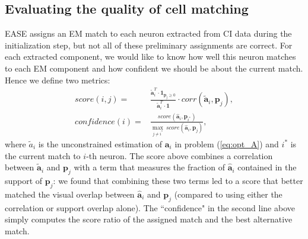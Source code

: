 \documentclass[10pt,letterpaper]{article}
\begin{document}
{%
\subsection{Evaluating the quality of cell matching}
EASE assigns an EM match to each neuron extracted from CI data during the initialization step, but not all of these preliminary assignments are correct. For each extracted component, we would like to know how well this neuron matches to each EM component and how confident we should be about the current match. Hence we define two metrics: 
 \begin{align}
 score(i, j) =& \frac{\tilde{\bm{a}}_i^T \cdot \bm{1}_{\bm{p}_j\geq 0} }{\tilde{\bm{a}}_i^T \cdot \bm{1}} \cdot corr(\tilde{\bm{a}}_{i}, \bm{p}_j),  \label{eq:score}\\
 confidence(i) =& \frac{score(\hat{\bm{a}}_i, \bm{p}_{i^*})}{\underset{j \neq i^*}{\max}~ score(\hat{\bm{a}}_i, \bm{p}_{j}) }, \label{eq:confidence}
 \end{align}
 where $\tilde{a}_i$ is the unconstrained estimation of $\bm{a}_i$ in problem (\ref{eq:opt_A}) and $i^*$ is the current match to $i$-th neuron. 
 The score above combines a correlation between $\tilde{\bm{a}}_{i}$ and $\bm{p}_j$ with a term that measures the fraction of $\hat{\bm{a}}_{i}$ contained in the support of $\bm{p}_j$: we found that combining these two terms led to a score that better matched the visual overlap between $\hat{\bm{a}}_{i}$ and $\bm{p}_j$ (compared to using either the correlation or support overlap alone).  The ``confidence" in the second line above simply computes the score ratio of the assigned match and the best alternative match.
 
}
\end{document}
